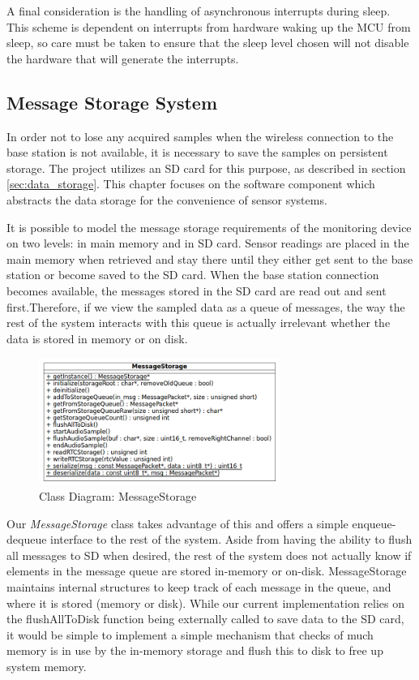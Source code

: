 A final consideration is the handling of asynchronous interrupts during sleep. This scheme is dependent on interrupts from hardware waking up the MCU from sleep, so care must be taken to ensure that the sleep level chosen will not disable the hardware that will generate the interrupts. 

\subsection {Message Storage System}
In order not to lose any acquired samples when the wireless connection to the base station is not available, it is necessary to save the samples on persistent storage. The project utilizes an SD card for this purpose, as described in section \ref{sec:data_storage}. This chapter focuses on the software component which abstracts the data storage for the convenience of sensor systems.

It is possible to model the message storage requirements of the monitoring device on two levels: in main memory and in SD card. Sensor readings are placed in the main memory when retrieved and stay there until they either get sent to the base station or become saved to the SD card. When the base station connection becomes available, the messages stored in the SD card are read out and sent first.Therefore, if we view the sampled data as a queue of messages, the way the rest of the system interacts with this queue is actually irrelevant whether the data is stored in memory or on disk. 

\begin{figure}[htb]
\centering
\includegraphics[width=0.7\textwidth]{Images/message_storage}
\caption{Class Diagram: MessageStorage}
\label{fig:class_message_storage}
\end{figure}

Our \textit{MessageStorage} class takes advantage of this and offers a simple enqueue-dequeue interface to the rest of the system. Aside from having the ability to flush all messages to SD when desired, the rest of the system does not actually know if elements in the message queue are stored in-memory or on-disk. MessageStorage maintains internal structures to keep track of each message in the queue, and where it is stored (memory or disk). While our current implementation relies on the flushAllToDisk function being externally called to save data to the SD card, it would be simple to implement a simple mechanism that checks of much memory is in use by the in-memory storage and flush this to disk to free up system memory.

